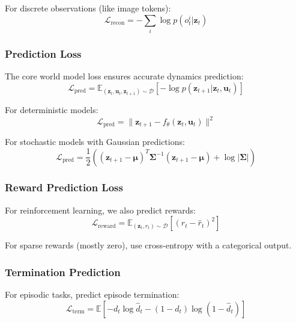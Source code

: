 For discrete observations (like image tokens):
\begin{equation}
\mathcal{L}_{\text{recon}} = -\sum_i \log p(o_t^i | \mathbf{z}_t)
\end{equation}

\subsubsection{Prediction Loss}

The core world model loss ensures accurate dynamics prediction:
\begin{equation}
\mathcal{L}_{\text{pred}} = \mathbb{E}_{(\mathbf{z}_t, \mathbf{u}_t, \mathbf{z}_{t+1}) \sim \mathcal{D}} \left[ -\log p(\mathbf{z}_{t+1} | \mathbf{z}_t, \mathbf{u}_t) \right]
\end{equation}

For deterministic models:
\begin{equation}
\mathcal{L}_{\text{pred}} = \| \mathbf{z}_{t+1} - f_\theta(\mathbf{z}_t, \mathbf{u}_t) \|^2
\end{equation}

For stochastic models with Gaussian predictions:
\begin{equation}
\mathcal{L}_{\text{pred}} = \frac{1}{2} \left( (\mathbf{z}_{t+1} - \boldsymbol{\mu})^T \boldsymbol{\Sigma}^{-1} (\mathbf{z}_{t+1} - \boldsymbol{\mu}) + \log|\boldsymbol{\Sigma}| \right)
\end{equation}

\subsubsection{Reward Prediction Loss}

For reinforcement learning, we also predict rewards:
\begin{equation}
\mathcal{L}_{\text{reward}} = \mathbb{E}_{(\mathbf{z}_t, r_t) \sim \mathcal{D}} \left[ (r_t - \hat{r}_t)^2 \right]
\end{equation}

For sparse rewards (mostly zero), use cross-entropy with a categorical output.

\subsubsection{Termination Prediction}

For episodic tasks, predict episode termination:
\begin{equation}
\mathcal{L}_{\text{term}} = \mathbb{E} \left[ -d_t \log \hat{d}_t - (1-d_t) \log(1-\hat{d}_t) \right]
\end{equation}

